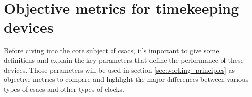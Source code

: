 \section{Objective metrics for timekeeping devices}
\label{sec:objective_metrics}

Before diving into the core subject of \acrfull{csacs}, it's important to give some definitions and explain the key parameters that define the performance of these devices.
Those parameters will be used in section \ref{sec:working_principles} as objective metrics to compare and highlight the major differences between various types of \acrshort{csacs} and other types of clocks.




